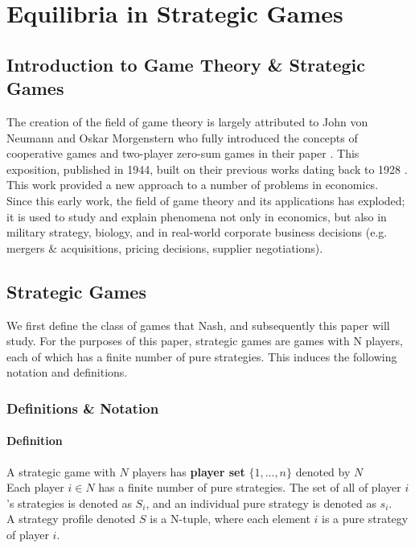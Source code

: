 \documentclass[12pt]{article}
\newcommand{\Definition}{\paragraph{Definition}}
\begin{document}
	\section[Equilibria in Strategic Games]{Equilibria in Strategic Games\cite{28}}%

	\subsection{Introduction to Game Theory \& Strategic Games}
	The creation of the field of game theory is largely attributed to John von Neumann and Oskar Morgenstern who fully introduced the concepts of cooperative games and two-player zero-sum games in their paper \cite{26} . This exposition, published in 1944,  built on their previous works dating back to 1928 \cite{27}. This work provided a new approach to a number of problems in economics. \\
	
	Since this early work, the field of game theory and its applications has exploded; it is used to study and explain phenomena not only in economics, but also in military strategy, biology, and in real-world corporate business decisions (e.g. mergers \& acquisitions, pricing decisions, supplier negotiations).
	
	\subsection{Strategic Games}
	
	We first define the class of games that Nash, and subsequently this paper will study. For the purposes of this paper, strategic games are games with N players, each of which has a finite number of pure strategies. This induces the following notation and definitions.
	
	\subsubsection{Definitions \& Notation}
	
	\Definition A strategic game with $N$ players has \textbf{player set} $\{1,...,n\}$ denoted by $N$\\
	
	Each player $i \in N$ has a finite number of pure strategies. The set of all of player $i$'s strategies is denoted as $S_i$, and an individual pure strategy is denoted as $s_i$.\\
	
	A strategy profile denoted $S$ is a N-tuple, where each element $i$ is a pure strategy of player $i$.\\
	
\end{document}
